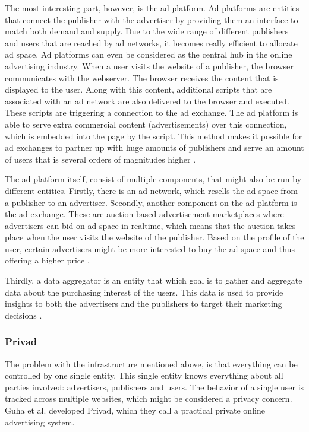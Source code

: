 The most interesting part, however, is the ad platform. Ad platforms are entities that connect the publisher with the advertiser by providing them an interface to match both demand and supply. Due to the wide range of different publishers and users that are reached by ad networks, it becomes really efficient to allocate ad space. Ad platforms can even be considered as the central hub in the online advertising industry. When a user visits the website of a publisher, the browser communicates with the webserver. The browser receives the content that is displayed to the user. Along with this content, additional scripts that are associated with an ad network are also delivered to the browser and executed. These scripts are triggering a connection to the ad exchange. The ad platform is able to serve extra commercial content (advertisements) over this connection, which is embedded into the page by the script. This method makes it possible for ad exchanges to partner up with huge amounts of publishers and serve an amount of users that is several orders of magnitudes higher \cite{estrada2017online}.

The ad platform itself, consist of multiple components, that might also be run by different entities. Firstly, there is an ad network, which resells the ad space from a publisher to an advertiser. Secondly, another component on the ad platform is the ad exchange. These are auction based advertisement marketplaces where advertisers can bid on ad space in realtime, which means that the auction takes place when the user visits the website of the publisher. Based on the profile of the user, certain advertisers might be more interested to buy the ad space and thus offering a higher price \cite{estrada2017online}. 

Thirdly, a data aggregator is an entity that which goal is to gather and aggregate data about the purchasing interest of the users. This data is used to provide insights to both the advertisers and the publishers to target their marketing decisions \cite{estrada2017online}.

\subsubsection{Privad}
The problem with the infrastructure mentioned above, is that everything can be controlled by one single entity. This single entity knows everything about all parties involved: advertisers, publishers and users. The behavior of a single user is tracked across multiple websites, which might be considered a privacy concern. Guha et al. \cite{guha2011privad} developed Privad, which they call a practical private online advertising system. 


